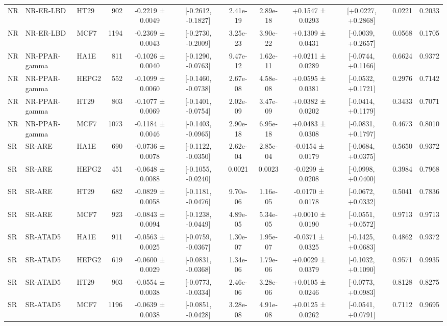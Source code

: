 \begin{landscape}
\begin{longtable}{lll r cc cc cc cc}
NR & NR-ER-LBD & HT29 & 902 & -0.2219 ± 0.0049 & [-0.2612, -0.1827] & 2.41e-19 & 2.89e-18 & +0.1547 ± 0.0293 & [+0.0227, +0.2868] & 0.0221 & 0.2033 \\
NR & NR-ER-LBD & MCF7 & 1194 & -0.2369 ± 0.0043 & [-0.2730, -0.2009] & 3.25e-23 & 3.90e-22 & +0.1309 ± 0.0431 & [-0.0039, +0.2657] & 0.0568 & 0.1705 \\
\addlinespace[1.5pt]
NR & NR-PPAR-gamma & HA1E & 811 & -0.1026 ± 0.0040 & [-0.1290, -0.0763] & 9.47e-12 & 1.62e-11 & +0.0211 ± 0.0289 & [-0.0744, +0.1166] & 0.6624 & 0.9372 \\
NR & NR-PPAR-gamma & HEPG2 & 552 & -0.1099 ± 0.0060 & [-0.1460, -0.0738] & 2.67e-08 & 4.58e-08 & +0.0595 ± 0.0381 & [-0.0532, +0.1721] & 0.2976 & 0.7142 \\
NR & NR-PPAR-gamma & HT29 & 803 & -0.1077 ± 0.0069 & [-0.1401, -0.0754] & 2.02e-09 & 3.47e-09 & +0.0382 ± 0.0202 & [-0.0414, +0.1179] & 0.3433 & 0.7071 \\
NR & NR-PPAR-gamma & MCF7 & 1073 & -0.1184 ± 0.0046 & [-0.1403, -0.0965] & 2.90e-18 & 6.95e-18 & +0.0483 ± 0.0308 & [-0.0831, +0.1797] & 0.4673 & 0.8010 \\
\midrule\midrule
SR & SR-ARE & HA1E & 690 & -0.0736 ± 0.0078 & [-0.1122, -0.0350] & 2.62e-04 & 2.85e-04 & -0.0154 ± 0.0179 & [-0.0684, +0.0375] & 0.5650 & 0.9372 \\
SR & SR-ARE & HEPG2 & 451 & -0.0648 ± 0.0088 & [-0.1055, -0.0240] & 0.0021 & 0.0023 & -0.0299 ± 0.0208 & [-0.0998, +0.0400] & 0.3984 & 0.7968 \\
SR & SR-ARE & HT29 & 682 & -0.0829 ± 0.0058 & [-0.1181, -0.0476] & 9.70e-06 & 1.16e-05 & -0.0170 ± 0.0178 & [-0.0672, +0.0332] & 0.5041 & 0.7836 \\
SR & SR-ARE & MCF7 & 923 & -0.0843 ± 0.0094 & [-0.1238, -0.0449] & 4.89e-05 & 5.34e-05 & +0.0010 ± 0.0190 & [-0.0551, +0.0572] & 0.9713 & 0.9713 \\
\addlinespace[1.5pt]
SR & SR-ATAD5 & HA1E & 911 & -0.0563 ± 0.0025 & [-0.0759, -0.0367] & 1.30e-07 & 1.95e-07 & -0.0371 ± 0.0325 & [-0.1425, +0.0683] & 0.4862 & 0.9372 \\
SR & SR-ATAD5 & HEPG2 & 619 & -0.0600 ± 0.0029 & [-0.0831, -0.0368] & 1.34e-06 & 1.79e-06 & +0.0029 ± 0.0379 & [-0.1032, +0.1090] & 0.9571 & 0.9935 \\
SR & SR-ATAD5 & HT29 & 903 & -0.0554 ± 0.0038 & [-0.0773, -0.0334] & 2.46e-06 & 3.28e-06 & +0.0105 ± 0.0246 & [-0.0773, +0.0983] & 0.8128 & 0.8275 \\
SR & SR-ATAD5 & MCF7 & 1196 & -0.0639 ± 0.0038 & [-0.0851, -0.0428] & 3.28e-08 & 4.91e-08 & +0.0125 ± 0.0262 & [-0.0541, +0.0791] & 0.7112 & 0.9695 \\

\end{longtable}
\end{landscape}
